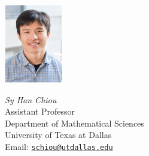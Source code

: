 \documentclass{report}
\newcommand{\email}[1]{\href{mailto:#1}{\normalfont\texttt{#1}}}
\begin{document}
\begin{minipage}[b]{1.2in}\centering
  \includegraphics[width=1.0in]{Chiou}\\
\end{minipage}
\hspace{0.2cm}
\begin{minipage}[b]{2.4in}
\begin{flushright}
  \emph{Sy Han Chiou}\\
  Assistant Professor\\
  Department of Mathematical Sciences\\
  University of Texas at Dallas\\
  Email: \email{schiou@utdallas.edu}
\end{flushright}
\end{minipage}
\end{document}
